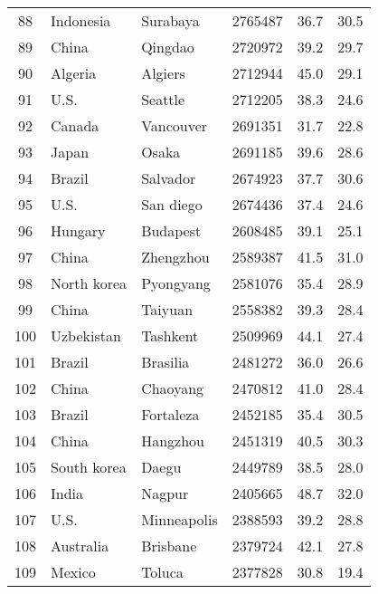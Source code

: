 \begin{center}
\begin{longtable}{clllcc}
  88 &           Indonesia &        Surabaya &    2765487 &     36.7 &     30.5 \\
  89 &               China &         Qingdao &    2720972 &     39.2 &     29.7 \\
  90 &             Algeria &         Algiers &    2712944 &     45.0 &     29.1 \\
  91 &                U.S. &         Seattle &    2712205 &     38.3 &     24.6 \\
  92 &              Canada &       Vancouver &    2691351 &     31.7 &     22.8 \\
  93 &               Japan &           Osaka &    2691185 &     39.6 &     28.6 \\
  94 &              Brazil &        Salvador &    2674923 &     37.7 &     30.6 \\
  95 &                U.S. &       San diego &    2674436 &     37.4 &     24.6 \\
  96 &             Hungary &        Budapest &    2608485 &     39.1 &     25.1 \\
  97 &               China &       Zhengzhou &    2589387 &     41.5 &     31.0 \\
  98 &         North korea &       Pyongyang &    2581076 &     35.4 &     28.9 \\
  99 &               China &         Taiyuan &    2558382 &     39.3 &     28.4 \\
 100 &          Uzbekistan &        Tashkent &    2509969 &     44.1 &     27.4 \\
 101 &              Brazil &        Brasilia &    2481272 &     36.0 &     26.6 \\
 102 &               China &        Chaoyang &    2470812 &     41.0 &     28.4 \\
 103 &              Brazil &       Fortaleza &    2452185 &     35.4 &     30.5 \\
 104 &               China &        Hangzhou &    2451319 &     40.5 &     30.3 \\
 105 &         South korea &           Daegu &    2449789 &     38.5 &     28.0 \\
 106 &               India &          Nagpur &    2405665 &     48.7 &     32.0 \\
 107 &                U.S. &     Minneapolis &    2388593 &     39.2 &     28.8 \\
 108 &           Australia &        Brisbane &    2379724 &     42.1 &     27.8 \\
 109 &              Mexico &          Toluca &    2377828 &     30.8 &     19.4 \\

\end{longtable}
\end{center}
